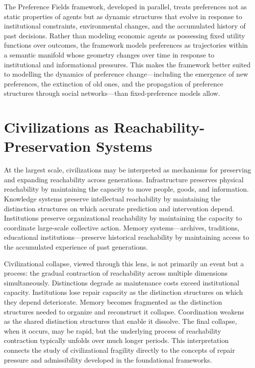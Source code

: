 \documentclass[11pt, oneside]{book}
\theoremstyle{definition}
\theoremstyle{remark}
\begin{document}
The Preference Fields framework, developed in parallel, treats preferences not as static properties of agents but as dynamic structures that evolve in response to institutional constraints, environmental changes, and the accumulated history of past decisions. Rather than modeling economic agents as possessing fixed utility functions over outcomes, the framework models preferences as trajectories within a semantic manifold whose geometry changes over time in response to institutional and informational pressures. This makes the framework better suited to modelling the dynamics of preference change—including the emergence of new preferences, the extinction of old ones, and the propagation of preference structures through social networks—than fixed-preference models allow.

\section{Civilizations as Reachability-Preservation Systems}

At the largest scale, civilizations may be interpreted as mechanisms for preserving and expanding reachability across generations. Infrastructure preserves physical reachability by maintaining the capacity to move people, goods, and information. Knowledge systems preserve intellectual reachability by maintaining the distinction structures on which accurate prediction and intervention depend. Institutions preserve organizational reachability by maintaining the capacity to coordinate large-scale collective action. Memory systems—archives, traditions, educational institutions—preserve historical reachability by maintaining access to the accumulated experience of past generations.

Civilizational collapse, viewed through this lens, is not primarily an event but a process: the gradual contraction of reachability across multiple dimensions simultaneously. Distinctions degrade as maintenance costs exceed institutional capacity. Institutions lose repair capacity as the distinction structures on which they depend deteriorate. Memory becomes fragmented as the distinction structures needed to organize and reconstruct it collapse. Coordination weakens as the shared distinction structures that enable it dissolve. The final collapse, when it occurs, may be rapid, but the underlying process of reachability contraction typically unfolds over much longer periods. This interpretation connects the study of civilizational fragility directly to the concepts of repair pressure and admissibility developed in the foundational frameworks.
\end{document}
